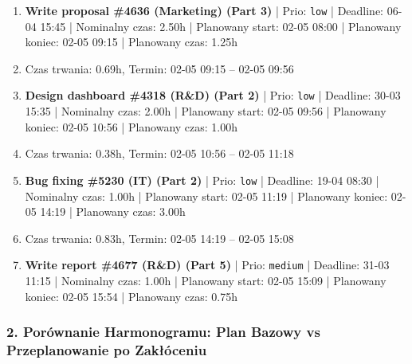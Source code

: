 {\begin{enumerate}
  \item [\textbf{14684}] \textbf{Write proposal \#4636 (Marketing) (Part 3)} | Prio: \texttt{low} | Deadline: 06-04 15:45 | Nominalny czas: 2.50h | Planowany start: 02-05 08:00 | Planowany koniec: 02-05 09:15 | Planowany czas: 1.25h
  \item [\textbf{PRZERWA}] Czas trwania: 0.69h, Termin: 02-05 09:15 -- 02-05 09:56
  \item [\textbf{14691}] \textbf{Design dashboard \#4318 (R\&D) (Part 2)} | Prio: \texttt{low} | Deadline: 30-03 15:35 | Nominalny czas: 2.00h | Planowany start: 02-05 09:56 | Planowany koniec: 02-05 10:56 | Planowany czas: 1.00h
  \item [\textbf{PRZERWA}] Czas trwania: 0.38h, Termin: 02-05 10:56 -- 02-05 11:18
  \item [\textbf{14680}] \textbf{Bug fixing \#5230 (IT) (Part 2)} | Prio: \texttt{low} | Deadline: 19-04 08:30 | Nominalny czas: 1.00h | Planowany start: 02-05 11:19 | Planowany koniec: 02-05 14:19 | Planowany czas: 3.00h
  \item [\textbf{PRZERWA}] Czas trwania: 0.83h, Termin: 02-05 14:19 -- 02-05 15:08
  \item [\textbf{14640}] \textbf{Write report \#4677 (R\&D) (Part 5)} | Prio: \texttt{medium} | Deadline: 31-03 11:15 | Nominalny czas: 1.00h | Planowany start: 02-05 15:09 | Planowany koniec: 02-05 15:54 | Planowany czas: 0.75h
\end{enumerate}
}

\subsubsection*{2. Porównanie Harmonogramu: Plan Bazowy vs Przeplanowanie po Zakłóceniu}

